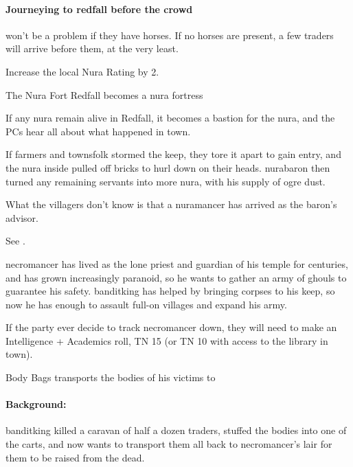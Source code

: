 \begin{multicols}{2}
\paragraph{Journeying to \gls{redfall} before the crowd}
won't be a problem if they have horses.
If no horses are present, a few traders will arrive before them, at the very least.

Increase the local Nura Rating by 2.

{The Nura Fort}%
{Redfall becomes a nura fortress}%

If any nura remain alive in Redfall, it becomes a bastion for the nura, and the PCs hear all about what happened in \gls{town}.

If farmers and townsfolk stormed the keep, they tore it apart to gain entry, and the nura inside pulled off bricks to hurl down on their heads.
\Gls{nurabaron} then turned any remaining servants into more nura, with his supply of ogre dust.

What the villagers don't know is that a nuramancer has arrived as the baron's advisor.

See .

\stopcontents[sq]

\resumecontents[Forest]
\resumecontents[Town]
\stopcontents[Town]
\stopcontents[Forest]

\startcontents[sq]

\sqminitoc

\noindent
\Gls{necromancer} has lived as the lone priest and guardian of his temple for centuries, and has grown increasingly paranoid, so he wants to gather an army of ghouls to guarantee his safety.
\Gls{banditking} has helped by bringing corpses to his keep, so now he has enough to assault full-on villages and expand his army.

If the party ever decide to track \gls{necromancer} down, they will need to make an Intelligence + Academics roll, TN 15 (or TN 10 with access to the library in town).

{Body Bags}%
{ transports the bodies of his victims to }%

\paragraph{Background:}
\Gls{banditking} killed a caravan of half a dozen traders, stuffed the bodies into one of the carts, and now wants to transport them all back to \gls{necromancer}'s lair for them to be raised from the dead.


\end{multicols}
